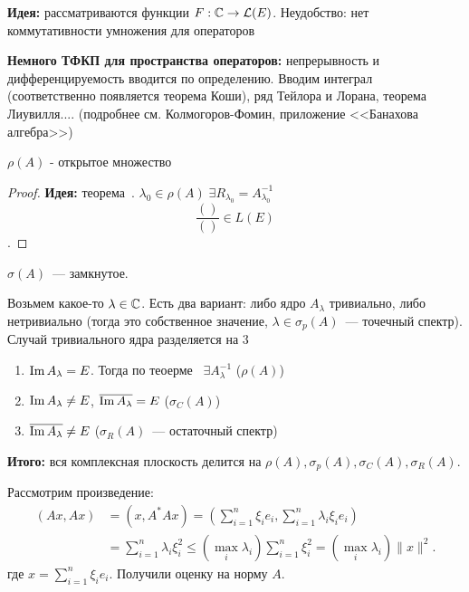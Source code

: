 \textbf{Идея:} рассматриваются функции $F: \mathbb{C} \to \mathcal{L}(E)$. Неудобство: нет коммутативности умножения для операторов

\textbf{Немного ТФКП для пространства операторов:} непрерывность и дифференцируемость вводится по определению. Вводим интеграл (соответственно появляется теорема Коши), ряд Тейлора и Лорана, теорема Лиувилля.... (подробнее см. Колмогоров-Фомин, приложение <<Банахова алгебра>>)

\begin{statement}[$0$]
    $\rho(A)$ - открытое множество
\end{statement}

\begin{proof}
    \textbf{Идея:} теорема~.
    $\lambda_0 \in \rho(A) \; \exists R_{\lambda_0}=A_{\lambda_0}^{-1}$
    $$\frac{()}{()} \in L(E)$$.
\end{proof}

\begin{corollary}
$\sigma(A)$~--- замкнутое.
\end{corollary}

Возьмем какое-то $\lambda \in \mathbb{C}$. Есть два вариант: либо ядро $A_\lambda$ тривиально, либо нетривиально (тогда это собственное значение, $\lambda \in \sigma_p(A)$~--- точечный спектр). Случай тривиального ядра разделяется на 3
\begin{enumerate}
    \item $\operatorname{Im} A_\lambda=E$. Тогда по теоерме~ $\exists A_\lambda^{-1}$ ($\rho(A)$)
    \item $\operatorname{Im} A_\lambda \neq E$, $\overline{\operatorname{Im} A_\lambda} = E$ ($\sigma_C(A)$)
    \item $\overline{\operatorname{Im} A_\lambda} \neq E$ ($\sigma_R(A)$~--- остаточный спектр)
\end{enumerate}

\textbf{Итого:} вся комплексная плоскость делится на $\rho(A), \sigma_p(A), \sigma_C(A), \sigma_R(A)$.

Рассмотрим произведение:
\begin{align*}
    (Ax, Ax) &= (x, A^*Ax) = (\sum\limits_{i = 1}^n \xi_i e_i, \sum\limits_{i = 1}^n \lambda_i \xi_i e_i )\\
    &= \sum\limits_{i = 1}^n \lambda_i \xi_i^2 \leq (\max\limits_{i} \lambda_i) \sum\limits_{i = 1}^n \xi_i^2 = (\max\limits_{i} \lambda_i) \|x\|^2.
\end{align*}
где $x = \sum\limits_{i=1}^n \xi_i e_i$. Получили оценку на норму $A$.

